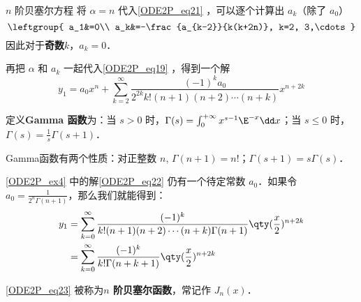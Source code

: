 \begin{example}{$n$ 阶贝塞尔方程}
将 $\alpha=n$ 代入\autoref{ODE2P_eq21} ，可以逐个计算出 $a_k$（除了 $a_0$）
\begin{equation}
\leftgroup{
    a_1&=0\\
    a_k&=-\frac{a_{k-2}}{k(k+2n)}, k=2, 3,\cdots
}
\end{equation}
因此对于\textbf{奇数}$k$，$a_k=0$．

再把 $\alpha$ 和 $a_k$ 一起代入\autoref{ODE2P_eq19} ，得到一个解
\begin{equation}\label{ODE2P_eq22}
y_1=a_0x^n+\sum\limits^\infty_{k=2}\frac{(-1)^ka_0}{2^{2k}k!(n+1)(n+2)\cdots(n+k)}x^{n+2k}
\end{equation}


定义\textbf{Gamma 函数}为：当 $s>0$ 时，$\Gamma(s)=\int_0^{+\infty}x^{s-1}\E^{-x}\dd x$；当 $s\leq 0$ 时，$\Gamma(s)=\frac{1}{s}\Gamma(s+1)$．

Gamma函数有两个性质：对正整数 $n$, $\Gamma(n+1)=n!$；$\Gamma(s+1)=s\Gamma(s)$．

\autoref{ODE2P_ex4}  中的解\autoref{ODE2P_eq22} 仍有一个待定常数 $a_0$．如果令 $a_0=\frac{1}{2^n\Gamma(n+1)}$，那么我们就能得到：
\begin{equation}\label{ODE2P_eq23}
\begin{aligned}
y_1&=\sum\limits^\infty_{k=0}\frac{(-1)^k}{k!(n+1)(n+2)\cdots(n+k)\Gamma(n+1)}\qty(\frac{x}{2})^{n+2k}\\
 &=\sum\limits^\infty_{k=0}\frac{(-1)^k}{k!\Gamma(n+k+1)}\qty(\frac{x}{2})^{n+2k}
\end{aligned}
\end{equation}

\autoref{ODE2P_eq23} 被称为\textbf{$n$ 阶贝塞尔函数}，常记作 $J_n(x)$．


\end{example}



